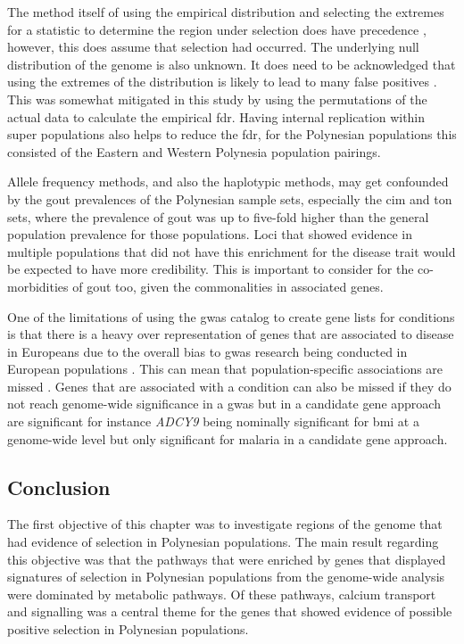 \documentclass[]{report}
\begin{document}
The method itself of using the empirical distribution and selecting the
extremes for a statistic to determine the region under selection does
have precedence \citep{voight2006map, Hider2013, Jonnalagadda2017},
however, this does assume that selection had occurred. The underlying
null distribution of the genome is also unknown. It does need to be
acknowledged that using the extremes of the distribution is likely to
lead to many false positives \citep{Teshima2006}. This was somewhat
mitigated in this study by using the permutations of the actual data to
calculate the empirical \gls{fdr}. Having internal replication within
super populations also helps to reduce the \gls{fdr}, for the Polynesian
populations this consisted of the Eastern and Western Polynesia
population pairings.

Allele frequency methods, and also the haplotypic methods, may get
confounded by the gout prevalences of the Polynesian sample sets,
especially the \gls{cim} and \gls{ton} sets, where the prevalence of
gout was up to five-fold higher than the general population prevalence
for those populations. Loci that showed evidence in multiple populations
that did not have this enrichment for the disease trait would be
expected to have more credibility. This is important to consider for the
co-morbidities of gout too, given the commonalities in associated genes.

One of the limitations of using the \gls{gwas} catalog to create gene
lists for conditions is that there is a heavy over representation of
genes that are associated to disease in Europeans due to the overall
bias to \gls{gwas} research being conducted in European populations
\citep{Haga2010, Popejoy2016}. This can mean that population-specific
associations are missed \citep{Weissglas-Volkov2013, Minster2016}. Genes
that are associated with a condition can also be missed if they do not
reach genome-wide significance in a \gls{gwas} but in a candidate gene
approach are significant for instance \emph{ADCY9} being nominally
significant for \gls{bmi} at a genome-wide level but only significant
for malaria in a candidate gene approach.

\subsection{Conclusion}\label{conclusion}

The first objective of this chapter was to investigate regions of the
genome that had evidence of selection in Polynesian populations. The
main result regarding this objective was that the pathways that were
enriched by genes that displayed signatures of selection in Polynesian
populations from the genome-wide analysis were dominated by metabolic
pathways. Of these pathways, calcium transport and signalling was a
central theme for the genes that showed evidence of possible positive
selection in Polynesian populations.
\end{document}
